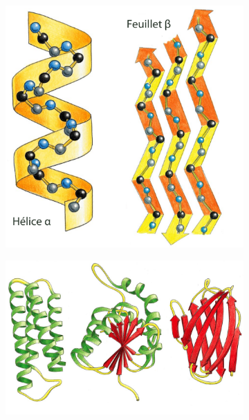 \begin{figure}[h]
  \begin{subfigure}{.4\textwidth}
  \centering
  {\includegraphics[width=0.9\linewidth]{./figures/ch1/secondary_structure.png}}
    \caption{}
    \label{Fig:secondary_structure}
  \hspace{0.2cm}
  \end{subfigure}
  \begin{subfigure}{.6\textwidth}
  \centering
  {\includegraphics[width=\linewidth]{./figures/ch1/tertiary_structure.jpg}}
    \caption{}
    \label{Fig:tertiary_structure}
  \hspace{0.2cm}
  \end{subfigure}

\end{figure}
